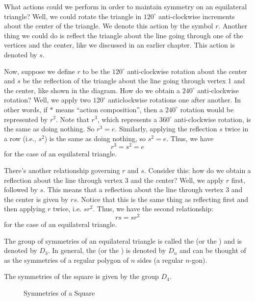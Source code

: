 What actions could we perform in order to maintain symmetry on an equilateral triangle? Well, we could rotate the triangle in $120^\circ$ anti-clockwise increments about the center of the triangle. We denote this action by the symbol $r$. Another thing we could do is reflect the triangle about the line going through one of the vertices and the center, like we discussed in an earlier chapter. This action is denoted by $s$.

Now, suppose we define $r$ to be the $120^\circ$ anti-clockwise rotation about the center and $s$ be the reflection of the triangle about the line going through vertex 1 and the center, like shown in the diagram. How do we obtain a $240^\circ$ anti-clockwise rotation? Well, we apply two $120^\circ$ anticlockwise rotations one after another. In other words, if $\ast$ means ``action composition'', then a $240^\circ$ rotation would be represented by $r^2$. Note that $r^3$, which represents a $360^\circ$ anti-clockwise rotation, is the same as doing nothing. So $r^3 = e$. Similarly, applying the reflection $s$ twice in a row (i.e., $s^2$) is the same as doing nothing, so $s^2 = e$. Thus, we have
\[
    r^3 = s^2 = e
\]
for the case of an equilateral triangle.

There's another relationship governing $r$ and $s$. Consider this: how do we obtain a reflection about the line through vertex 3 and the center? Well, we apply $r$ first, followed by $s$. This means that a reflection about the line through vertex 3 and the center is given by $rs$. Notice that this is the same thing as reflecting first and then applying $r$ twice, i.e. $sr^2$. Thus, we have the second relationship:
\[
    rs = sr^2
\]
for the case of an equilateral triangle.

The group of symmetries of an equilateral triangle is called the  (or the ) and is denoted by $D_3$. In general, the  (or the ) is denoted by $D_n$ and can be thought of as the symmetries of a regular polygon of $n$ sides (a regular $n$-gon).



\begin{example}
    The symmetries of the square is given by the group $D_4$.
\end{example}
\begin{figure}[h]
    \centering
    \caption{Symmetries of a Square}
\end{figure}

